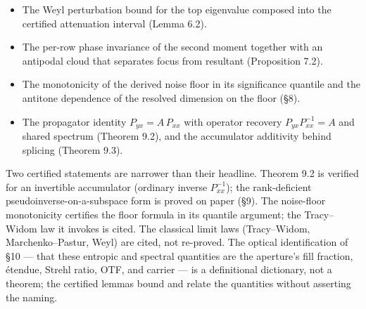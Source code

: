 \documentclass[10pt,letterpaper,twocolumn]{article}
\begin{document}
\begin{itemize}
  The algebra behind the coupling's null moments (Theorem 5.6) --- the four steps below, with the assembly into \(\operatorname{tr}(C_AC_B)/(T-1)\) done on paper above and not in Lean: that summing a function of \(\sigma(i)\) over the symmetric group counts each image exactly \((T-1)!\) times whichever index \(i\) is; the vanishing first moment \(\mathbb E_\pi[S]=0\) for a centred sending side; the same-index second-moment term \(\sum_\sigma A_{\sigma(i)d}A_{\sigma(i)e}=(T-1)!\,(C_A)_{de}\); the independence of the distinct-index term from \emph{which} pair of indices is taken; and its value \(T(T-1)\sum_\sigma f(\sigma 0)g(\sigma 1)=T!\big((\sum f)(\sum g)-\sum_a f_ag_a\big)\). Both moment structures are established by explicit bijections --- the decomposition of a permutation of \(\mathrm{Fin}(n{+}1)\) into its value at \(0\) and a permutation of the rest, and right multiplication by an explicitly constructed carrier permutation. The coefficient identity \(1/T+1/(T(T-1))=1/(T-1)\) and the reduction of the resulting entrywise double sum to \(\operatorname{tr}(C_AC_B)\) for symmetric Gram matrices are certified alongside.
\item
  The Weyl perturbation bound for the top eigenvalue composed into the certified attenuation interval (Lemma 6.2).
\item
  The per-row phase invariance of the second moment together with an antipodal cloud that separates focus from resultant (Proposition 7.2).
\item
  The monotonicity of the derived noise floor in its significance quantile and the antitone dependence of the resolved dimension on the floor (§8).
\item
  The propagator identity \(P_{yx}=A\,P_{xx}\) with operator recovery \(P_{yx}P_{xx}^{-1}=A\) and shared spectrum (Theorem 9.2), and the accumulator additivity behind splicing (Theorem 9.3).
\end{itemize}

Two certified statements are narrower than their headline. Theorem 9.2 is verified for an invertible accumulator (ordinary inverse \(P_{xx}^{-1}\)); the rank-deficient pseudoin\allowbreak{}verse-\allowbreak{}on-\allowbreak{}a-\allowbreak{}subspace form is proved on paper (§9). The noise-floor monotonicity certifies the floor formula in its quantile argument; the Tracy--Widom law it invokes is cited. The classical limit laws (Tracy--Widom, Marchenko--Pastur, Weyl) are cited, not re-proved. The optical identification of §10 --- that these entropic and spectral quantities are the aperture's fill fraction, étendue, Strehl ratio, OTF, and carrier --- is a definitional dictionary, not a theorem; the certified lemmas bound and relate the quantities without asserting the naming.
\end{document}

